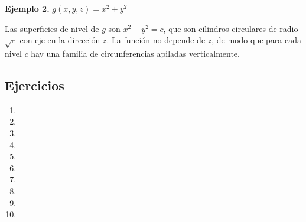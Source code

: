 \textbf{Ejemplo 2.} $g(x,y,z) = x^2 + y^2$

Las superficies de nivel de $g$ son $x^2 + y^2 = c$, que son cilindros circulares de radio $\sqrt{c}$ con eje en la dirección $z$. La función no depende de $z$, de modo que para cada nivel $c$ hay una familia de circunferencias apiladas verticalmente.

\subsection{Ejercicios}

\begin{enumerate}
    \item 
    \item 
    \item 
    \item 
    \item 
    \item 
    \item 
    \item 
    \item 
    \item 
\end{enumerate}